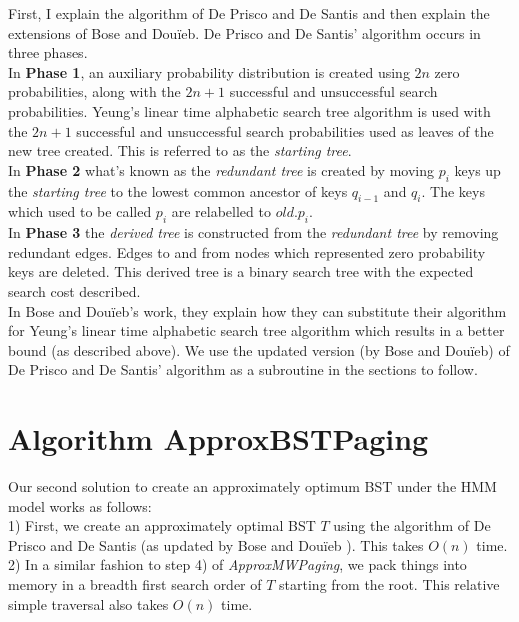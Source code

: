 \documentclass[letterpaper,12pt,titlepage,oneside,final]{book}
\theoremstyle{plain}
\begin{document}
First, I explain the algorithm of De Prisco and De Santis and then explain the extensions of Bose and Dou\"{i}eb. De Prisco and De Santis' algorithm occurs in three phases.\\

In \textbf{Phase 1}, an auxiliary probability distribution is created using $2n$ zero probabilities, along with the $2n+1$ successful and unsuccessful search probabilities. Yeung's linear time alphabetic search tree algorithm is used with the $2n+1$ successful and unsuccessful search probabilities used as leaves of the new tree created. This is referred to as the \textit{starting tree}. \\

In \textbf{Phase 2} what's known as the \textit{redundant tree} is created by moving $p_i$ keys up the \textit{starting tree} to the lowest common ancestor of keys $q_{i-1}$ and $q_i$. The keys which used to be called $p_i$ are relabelled to $old.p_i$. \\

In \textbf{Phase 3} the \textit{derived tree} is constructed from the \textit{redundant tree} by removing redundant edges. Edges to and from nodes which represented zero probability keys are deleted. This derived tree is a binary search tree with the expected search cost described. \\

In Bose and Dou\"{i}eb's work, they explain how they can substitute their algorithm for Yeung's linear time alphabetic search tree algorithm which results in a better bound (as described above). We use the updated version (by Bose and Dou\"{i}eb) of De Prisco and De Santis' algorithm as a subroutine in the sections to follow.

\section{Algorithm ApproxBSTPaging}

Our second solution to create an approximately optimum BST under the HMM model works as follows: \\

1) First, we create an approximately optimal BST $T$ using the algorithm of De Prisco and De Santis \cite{de1993binary} (as updated by Bose and Dou\"{i}eb \cite{bose2009efficient}). This takes $O(n)$ time. \\

2) In a similar fashion to step 4) of \textit{ApproxMWPaging}, we pack things into memory in a breadth first search order of $T$ starting from the root. This relative simple traversal also takes $O(n)$ time. \\
\end{document}
